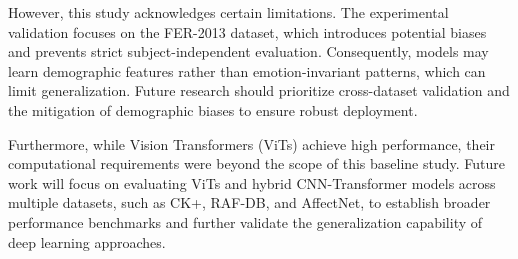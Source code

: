 \documentclass[pdflatex,sn-basic]{sn-jnl}
\theoremstyle{thmstyleone}
\theoremstyle{thmstyletwo}
\theoremstyle{thmstylethree}
\begin{document}
However, this study acknowledges certain limitations. The experimental validation focuses on the FER-2013 dataset, which introduces potential biases and prevents strict subject-independent evaluation. Consequently, models may learn demographic features rather than emotion-invariant patterns, which can limit generalization. Future research should prioritize cross-dataset validation and the mitigation of demographic biases to ensure robust deployment.

Furthermore, while Vision Transformers (ViTs) achieve high performance, their computational requirements were beyond the scope of this baseline study. Future work will focus on evaluating ViTs and hybrid CNN-Transformer models across multiple datasets, such as CK+, RAF-DB, and AffectNet, to establish broader performance benchmarks and further validate the generalization capability of deep learning approaches.

\nocite{*}

\end{document}
